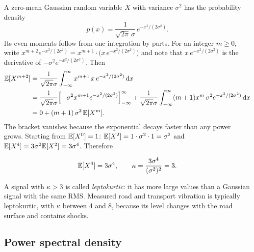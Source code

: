 A zero-mean Gaussian random variable $X$ with variance $\sigma^2$ has the probability density
\begin{equation}
  p(x) = \frac{1}{\sqrt{2\pi}\,\sigma}\, e^{-x^2/(2\sigma^2)} .
\end{equation}
Its even moments follow from one integration by parts. For an integer $m\ge 0$, write
$x^{m+2}e^{-x^2/(2\sigma^2)} = x^{m+1}\cdot\bigl(x\,e^{-x^2/(2\sigma^2)}\bigr)$ and note that
$x\,e^{-x^2/(2\sigma^2)}$ is the derivative of $-\sigma^2 e^{-x^2/(2\sigma^2)}$. Then
\begin{align}
  \mathbb{E}[X^{m+2}] &= \frac{1}{\sqrt{2\pi}\sigma}\int_{-\infty}^{\infty} x^{m+1}\, x\, e^{-x^2/(2\sigma^2)}\,\mathrm{d} x
  \nonumber\\
  &= \frac{1}{\sqrt{2\pi}\sigma}\Bigl[-\sigma^2 x^{m+1} e^{-x^2/(2\sigma^2)}\Bigr]_{-\infty}^{\infty}
   + \frac{1}{\sqrt{2\pi}\sigma}\int_{-\infty}^{\infty} (m+1)x^{m}\,\sigma^2 e^{-x^2/(2\sigma^2)}\,\mathrm{d} x
  \nonumber\\
  &= 0 + (m+1)\,\sigma^2\,\mathbb{E}[X^m] .
\end{align}
The bracket vanishes because the exponential decays faster than any power grows. Starting from
$\mathbb{E}[X^0]=1$: $\mathbb{E}[X^2] = 1\cdot\sigma^2\cdot 1 = \sigma^2$ and $\mathbb{E}[X^4] = 3\sigma^2\mathbb{E}[X^2] = 3\sigma^4$.
Therefore
\begin{result}
\begin{equation}\label{eq:gauss4}
  \mathbb{E}[X^4] = 3\sigma^4, \qquad \kappa = \frac{3\sigma^4}{(\sigma^2)^2} = 3 .
\end{equation}
\end{result}
A signal with $\kappa>3$ is called \emph{leptokurtic}: it has more large values than a Gaussian
signal with the same RMS. Measured road and transport vibration is typically leptokurtic, with
$\kappa$ between 4 and 8, because its level changes with the road surface and contains shocks.

\subsection{Power spectral density}\label{sec:psd}


